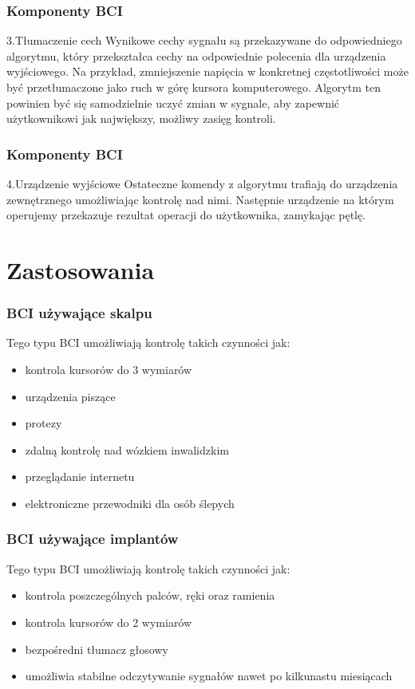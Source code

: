 \documentclass{beamer}
\begin{document}
\begin{frame}
    \frametitle{Komponenty BCI}
    \begin{block}{3.Tłumaczenie cech}
        Wynikowe cechy sygnału są przekazywane do odpowiedniego algorytmu, który przekształca cechy na odpowiednie 
        polecenia dla urządzenia wyjściowego. Na przykład, zmniejszenie napięcia w konkretnej częstotliwości może być
        przetłumaczone jako ruch w górę kursora komputerowego. Algorytm ten powinien być się samodzielnie uczyć zmian w sygnale,
        aby zapewnić użytkownikowi jak największy, możliwy zasięg kontroli.  
    \end{block}
\end{frame}

\begin{frame}
    \frametitle{Komponenty BCI}
    \begin{block}{4.Urządzenie wyjściowe}
        Ostateczne komendy z algorytmu trafiają do urządzenia zewnętrznego umożliwiając kontrolę nad nimi. Następnie 
        urządzenie na którym operujemy przekazuje rezultat operacji do użytkownika, zamykając pętlę.
    \end{block}
\end{frame}

\section{Zastosowania}

\begin{frame}
    \frametitle{BCI używające skalpu}
    Tego typu BCI umożliwiają kontrolę takich czynności jak:
    \begin{itemize}
        \item kontrola kursorów do 3 wymiarów
        \item urządzenia piszące
        \item protezy
        \item zdalną kontrolę nad wózkiem inwalidzkim
        \item przeglądanie internetu
        \item elektroniczne przewodniki dla osób ślepych
    \end{itemize}
\end{frame}

\begin{frame}
    \frametitle{BCI używające implantów}
    Tego typu BCI umożliwiają kontrolę takich czynności jak:
    \begin{itemize}
        \item kontrola poszczególnych palców, ręki oraz ramienia
        \item kontrola kursorów do 2 wymiarów
        \item bezpośredni tłumacz głosowy
        \item umożliwia stabilne odczytywanie sygnałów nawet po kilkunastu miesiącach
    \end{itemize}
\end{frame}
\end{document}
